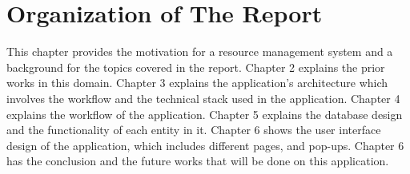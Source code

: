 \section{Organization of The Report}
This chapter provides the motivation for a resource management system and a background for the topics covered in the report. Chapter 2 explains the prior works in this domain. Chapter 3 explains the application's architecture which involves the workflow and the technical stack used in the application. Chapter 4 explains the workflow of the application. Chapter 5 explains the database design and the functionality of each entity in it. Chapter 6 shows the user interface design of the application, which includes different pages, and pop-ups. Chapter 6 has the conclusion and the future works that will be done on this application. 
